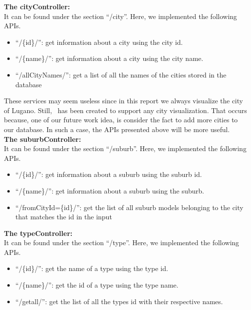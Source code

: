 {\bf The cityController:}\\
It can be found under the section ``/city''. Here, we implemented the following APIs.
\begin{itemize}
	\item ``/\{id\}/'': get information about a city using the city id.
	\item ``/\{name\}/'': get information about a city using the city name.
	\item ``/allCityNames/'':  get a list of all the names of the cities stored in the database
\end{itemize}
These services may seem useless since in this report we always visualize the city of Lugano. Still, \applicationName\ has been created to support any city visualization. That occurs because, one of our future work idea, is consider the fact to add more cities to our database. In such a case, the APIs presented above will be more useful.\\

{\bf The suburbController:}\\
It can be found under the section ``/suburb''. Here, we implemented the following APIs.
\begin{itemize}
	\item ``/\{id\}/'':  get information about a suburb using the suburb id.
	\item ``/\{name\}/'':  get information about a suburb using the suburb.
	\item ``/fromCityId=\{id\}/'': get the list of all suburb models belonging to the city that matches the id in the input
\end{itemize}

{\bf The typeController:}\\
It can be found under the section ``/type''. Here, we implemented the following APIs.
\begin{itemize}
	\item ``/\{id\}/'':  get the name of a type using the type id.
	\item ``/\{name\}/'':  get the id of a type using the type name.
	\item ``/getall/'': get the list of all the types id with their respective names.
\end{itemize}

